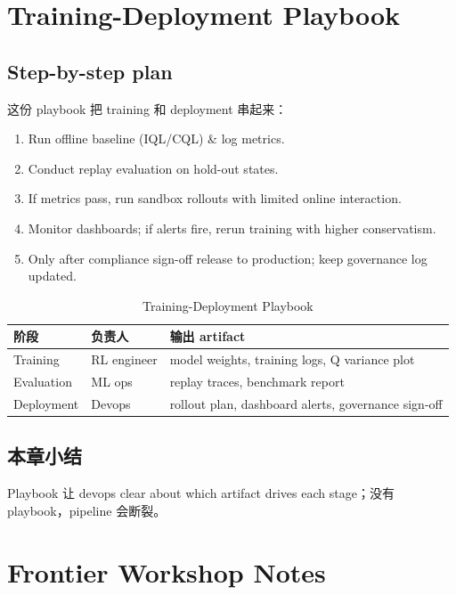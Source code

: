 \documentclass[a4paper]{article}
\begin{document}
\section{Training-Deployment Playbook}

\subsection{Step-by-step plan}

这份 playbook 把 training 和 deployment 串起来：

\begin{enumerate}
    \item Run offline baseline (IQL/CQL) & log metrics.
    \item Conduct replay evaluation on hold-out states.
    \item If metrics pass, run sandbox rollouts with limited online interaction.
    \item Monitor dashboards; if alerts fire, rerun training with higher conservatism.
    \item Only after compliance sign-off release to production; keep governance log updated.
\end{enumerate}

\begin{table}[H]
\centering
\begin{tabular}{p{} p{} p{}}
\toprule
阶段 & 负责人 & 输出 artifact \\
\midrule
Training & RL engineer & model weights, training logs, Q variance plot \\
Evaluation & ML ops & replay traces, benchmark report \\
Deployment & Devops & rollout plan, dashboard alerts, governance sign-off \\
\bottomrule
\end{tabular}
\caption{Training-Deployment Playbook}
\end{table}

\subsection{本章小结}

Playbook 让 devops clear about which artifact drives each stage；没有 playbook，pipeline 会断裂。

\section{Frontier Workshop Notes}
\end{document}
